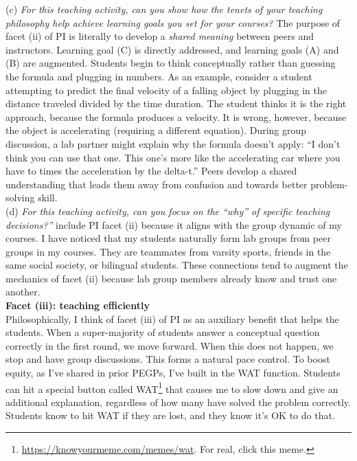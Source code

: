 \documentclass[../../../main.tex]{subfiles}
\begin{document}
(c) \textit{For this teaching activity, can you show how the tenets of your teaching philosophy help achieve learning goals you set for your courses?}  The purpose of facet (ii) of PI is literally to develop a \textit{shared meaning} between peers and instructors.  Learning goal (C) is directly addressed, and learning goals (A) and (B) are augmented.  Students begin to think conceptually rather than guessing the formula and plugging in numbers.  As an example, consider a student attempting to predict the final velocity of a falling object by plugging in the distance traveled divided by the time duration.  The student thinks it is the right approach, because the formula produces a velocity.  It is wrong, however, because the object is accelerating (requiring a different equation).  During group discussion, a lab partner might explain why the formula doesn't apply:  ``I don't think you can use that one. This one's more like the accelerating car where you have to times the acceleration by the delta-t.''  Peers develop a shared understanding that leads them away from confusion and towards better problem-solving skill.
\\
\vspace{0.25cm}
(d) \textit{For this teaching activity, can you focus on the ``why'' of specific teaching decisions?''}   include PI facet (ii) because it aligns with the group dynamic of my courses.  I have noticed that my students naturally form lab groups from peer groups in my courses.  They are teammates from varsity sports, friends in the same social society, or bilingual students.  These connections tend to augment the mechanics of facet (ii) because lab group members already know and trust one another.
\\
\vspace{0.25cm}
\textbf{Facet (iii): teaching efficiently}
\\
\vspace{0.25cm}
Philosophically, I think of facet (iii) of PI as an auxiliary benefit that helps the students.  When a super-majority of students answer a conceptual question correctly in the first round, we move forward.  When this does not happen, we stop and have group discussions.  This forms a natural pace control.  To boost equity, as I've shared in prior PEGPs, I've built in the WAT function.  Students can hit a special button called WAT\footnote{\url{https://knowyourmeme.com/memes/wat}.  For real, click this meme.} that causes me to slow down and give an additional explanation, regardless of how many have solved the problem correctly.  Students know to hit WAT if they are lost, and they know it's OK to do that.
\end{document}
